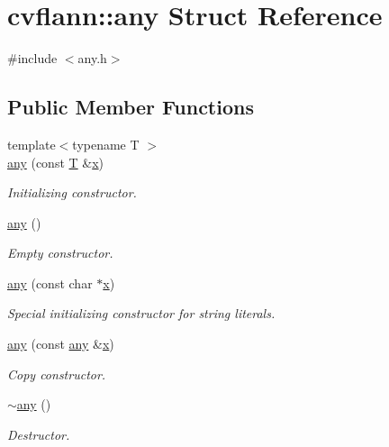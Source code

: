 \hypertarget{structcvflann_1_1any}{\section{cvflann\-:\-:any Struct Reference}
\label{structcvflann_1_1any}
}


{\ttfamily \#include $<$any.\-h$>$}

\subsection*{Public Member Functions}
\begin{DoxyCompactItemize}
\item 
{\footnotesize template$<$typename T $>$ }\\\hyperlink{structcvflann_1_1any_a614f578056e7fceff5cee29109da70cf}{any} (const \hyperlink{calib3d_8hpp_a3efb9551a871ddd0463079a808916717}{T} \&\hyperlink{highgui__c_8h_a6150e0515f7202e2fb518f7206ed97dc}{x})
\begin{DoxyCompactList}\small\item\em Initializing constructor. \end{DoxyCompactList}\item 
\hyperlink{structcvflann_1_1any_aebac2eb1e78c9326fba282f064e4c06d}{any} ()
\begin{DoxyCompactList}\small\item\em Empty constructor. \end{DoxyCompactList}\item 
\hyperlink{structcvflann_1_1any_a93751f7a76eb1b9502a8169de639b1a5}{any} (const char $\ast$\hyperlink{highgui__c_8h_a6150e0515f7202e2fb518f7206ed97dc}{x})
\begin{DoxyCompactList}\small\item\em Special initializing constructor for string literals. \end{DoxyCompactList}\item 
\hyperlink{structcvflann_1_1any_a7d8e54b78178d93012ec2dfaf5b462fc}{any} (const \hyperlink{structcvflann_1_1any}{any} \&\hyperlink{highgui__c_8h_a6150e0515f7202e2fb518f7206ed97dc}{x})
\begin{DoxyCompactList}\small\item\em Copy constructor. \end{DoxyCompactList}\item 
\hyperlink{structcvflann_1_1any_a2a2adac28a53cac0cd5051cefc4d301a}{$\sim$any} ()
\begin{DoxyCompactList}\small\item\em Destructor. \end{DoxyCompactList}\item 

\end{DoxyCompactItemize}
